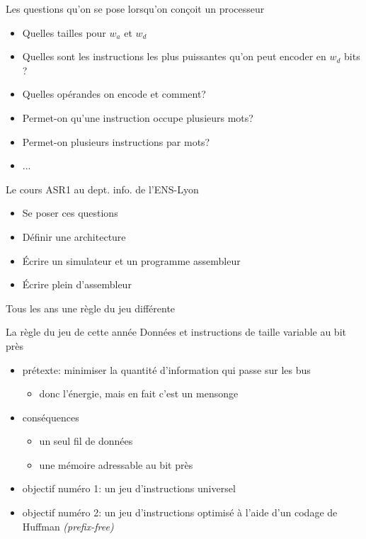 \documentclass[slidetop,11pt,table]{beamer}
\begin{document}
\begin{frame}{Les questions qu'on se pose lorsqu'on conçoit un processeur}
  \begin{itemize}
  \item Quelles tailles pour $w_a$ et $w_d$
  \item Quelles sont les instructions les plus puissantes qu'on peut encoder en $w_d$ bits ?
  \item Quelles opérandes on encode et comment?
    
  \item Permet-on qu'une instruction occupe plusieurs mots?
  \item Permet-on plusieurs instructions par mots?
  \item ...
    
  \end{itemize}
\end{frame}

\begin{frame}{Le cours ASR1 au dept. info. de l'ENS-Lyon}
  \begin{itemize}
  \item Se poser ces questions
  \item Définir une architecture
  \item Écrire un simulateur et un programme assembleur
  \item Écrire plein d'assembleur
  \end{itemize}
  Tous les ans une règle du jeu différente 
\end{frame}



\begin{frame}{La règle du jeu de cette année}
Données et instructions de taille variable au bit près
  \begin{itemize}
  \item prétexte: minimiser la quantité d'information qui passe sur les bus
    \begin{itemize}
    \item donc l'énergie, mais en fait c'est un mensonge
    \end{itemize}
  \item conséquences
    \begin{itemize}
    \item un seul fil de données
    \item une mémoire adressable au bit près
\end{itemize}
  \item objectif numéro 1: un jeu d'instructions universel
  \item objectif numéro 2: un jeu d'instructions optimisé à l'aide d'un codage de Huffman {\it (prefix-free)}
  \end{itemize}
\end{frame}
\end{document}
